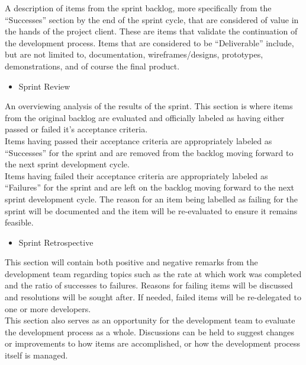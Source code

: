         A description of items from the sprint backlog, more specifically from the ``Successes'' section by the end of the
        sprint cycle, that are considered of value in the hands of the project client.  These are items that validate the 
        continuation of the development process.  Items that are considered to be ``Deliverable'' include, but are not 
        limited to, documentation, wireframes/designs, prototypes, demonstrations, and of course the final product.\\

    \begin{itemize} \item Sprint Review \end{itemize}
       
        An overviewing analysis of the results of the sprint.  This section is where items from the original backlog
        are evaluated and officially labeled as having either passed or failed it's acceptance criteria.\\

        Items having passed their acceptance criteria are appropriately labeled as ``Successes'' for the sprint and are 
        removed from the backlog moving forward to the next sprint development cycle.\\

        Items having failed their acceptance criteria are appropriately labeled as ``Failures'' for the sprint and are
        left on the backlog moving forward to the next sprint development cycle.  The reason for an item being labelled
        as failing for the sprint will be documented and  the item will be re-evaluated to ensure it remains feasible.\\  

    \begin{itemize} \item Sprint Retrospective \end{itemize}
        
        This section will contain both positive and negative remarks from the development team regarding topics such as 
        the rate at which work was completed and the ratio of successes to failures.  Reasons for failing items will be
        discussed and resolutions will be sought after.  If needed, failed items will be re-delegated to one or more 
        developers.\\

        This section also serves as an opportunity for the development team to evaluate the development process as a whole.
        Discussions can be held to suggest changes or improvements to how items are accomplished, or how the development
        process itself is managed.

    \newpage
    
    \newpage
    
    \newpage
    
    \newpage
    
    \newpage
    
    \newpage
    